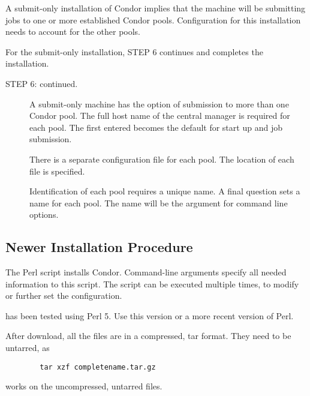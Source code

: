 A submit-only installation of Condor implies that the machine will
be submitting jobs to one or more established Condor pools.
Configuration for this installation needs to account for the
other pools.

For the submit-only installation, STEP 6 continues and completes
the installation.

\begin{description}

\item[STEP 6: continued. ]
     A submit-only machine has the option of submission to more than
     one Condor pool.
     The full host name of the central manager is required for each
     pool.
     The first entered becomes the default for start up and job
     submission.

     There is a separate configuration file for each pool.
     The location of each file is specified.

     Identification of each pool requires a unique name. 
     A final question sets a name for each pool.
     The name will be the argument for  command line options.

\end{description}

\subsection{\label{sec:new-install-procedure}
Newer Installation Procedure}

The Perl script  installs Condor.
Command-line arguments specify all needed information to this
script.
The script can be executed multiple times, to modify or further
set the configuration.

 has been tested using Perl 5.
Use this version or a more recent version of Perl.

After download, all the files are in a compressed, tar format.
They need to be untarred, as
\begin{verbatim}
        tar xzf completename.tar.gz
\end{verbatim}
 works on the uncompressed, untarred files.

